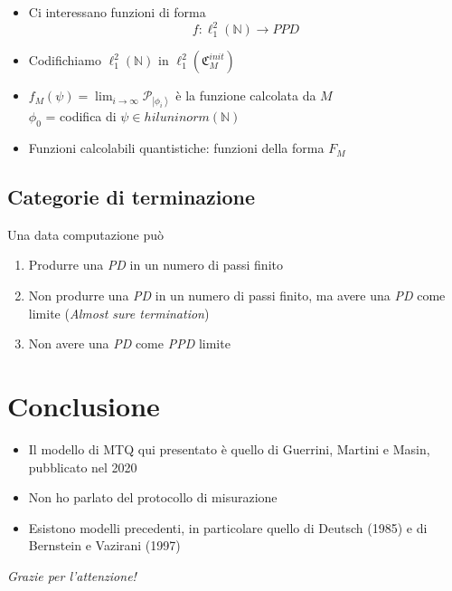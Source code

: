 \documentclass{beamer}
\newcommand{\ket}[1]{\left | #1 \right \rangle}
\newcommand{\conf}{\mathfrak{C}_{M}}
\newcommand{\hil}{\ell^{2}}
\newcommand{\hiluninorm}{\hil_{1}}
\begin{document}
\begin{frame}{\secname}{}
	\begin{itemize}
		\item<1-> Ci interessano funzioni di forma \[ f : \hiluninorm \left ( \mathbb{N} \right ) \rightarrow PPD \]
		\item<2-> Codifichiamo \( \hiluninorm \left ( \mathbb{N} \right ) \) in \( \hiluninorm \left ( \conf^{init} \right ) \)
		\item<2-> \( f_M(\psi) = \lim_{i \to \infty} \mathcal{P}_{\ket{\phi_{i}}} \) è la \alert{funzione calcolata} da $M$  \\ 
$\phi_0$ = codifica di $\psi \in hiluninorm \left ( \mathbb{N} \right )$ 
		\item<3-> \alert{Funzioni calcolabili quantistiche}: funzioni della forma $F_M$ 
	\end{itemize}
\end{frame}

\subsection{Categorie di terminazione}

\begin{frame}{\subsecname}{}
	Una data computazione può
	\begin{enumerate}
		\item<+-> Produrre una \textit{PD} in un numero di passi finito
		\item<+-> Non produrre una \textit{PD} in un numero di passi finito, ma avere una \textit{PD} come limite (\foreignlanguage{english}{\textit{Almost sure termination}})
		\item<+-> Non avere una \textit{PD} come \textit{PPD} limite
	\end{enumerate}
\end{frame}

\section{Conclusione}

\begin{frame}{\secname}{}
	\begin{itemize}
		\item<+-> Il modello di MTQ qui presentato è quello di Guerrini, Martini e Masin, pubblicato nel 2020
		\item<+-> Non ho parlato del protocollo di misurazione
		\item<+-> Esistono modelli precedenti, in particolare quello di Deutsch (1985) e di Bernstein e Vazirani (1997)
	\end{itemize}
\end{frame}

\begin{frame}{}
	\centering \huge
	\emph{Grazie per l'attenzione!}
\end{frame}
\end{document}
